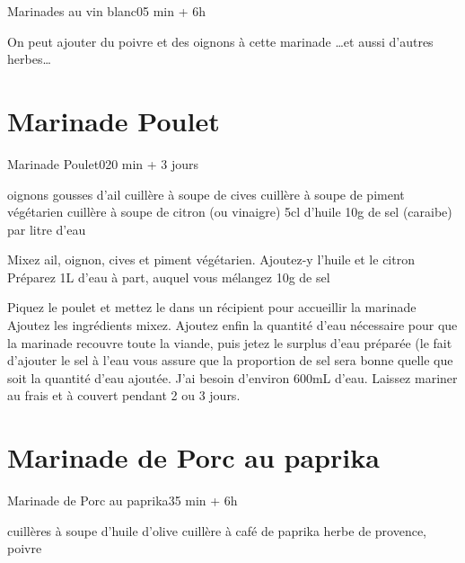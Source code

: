 {\begin{recette}{Marinades au vin blanc}{0}{5 min + 6h}{}
\begin{remarque}
On peut ajouter du poivre et des oignons à cette marinade \dots  et aussi d'autres herbes\dots
\end{remarque}
\end{recette}

\section{Marinade Poulet}
\begin{recette}{Marinade Poulet}{0}{20 min + 3 jours}{}
\begin{ingredients}
 oignons
 gousses d'ail
 cuillère à soupe de cives
 cuillère à soupe de piment végétarien
 cuillère à soupe de citron (ou vinaigre)
\ingredient 5cl d'huile
\ingredient 10g de sel (caraibe) par litre d'eau
\end{ingredients}

\begin{preparation}
\etape Mixez ail, oignon, cives et piment végétarien. Ajoutez-y l'huile et le citron
\etape Préparez 1L d'eau à part, auquel vous mélangez 10g de sel

\etape Piquez le poulet et mettez le dans un récipient pour accueillir la marinade
\etape Ajoutez les ingrédients mixez. 
\etape Ajoutez enfin la quantité d'eau nécessaire pour que la marinade recouvre toute la viande, puis jetez le surplus d'eau préparée (le fait d'ajouter le sel à l'eau vous assure que la proportion de sel sera bonne quelle que soit la quantité d'eau ajoutée. J'ai besoin d'environ 600mL d'eau. 
\etape Laissez mariner au frais et à couvert pendant 2 ou 3 jours. 
\end{preparation}
\end{recette}


\section{Marinade de Porc au paprika}
\begin{recette}{Marinade de Porc au paprika}{3}{5 min + 6h}{}
\begin{ingredients}
 cuillères à soupe d'huile d'olive
 cuillère à café de paprika
\ingredient herbe de provence, poivre
\end{ingredients}


\end{recette}}
